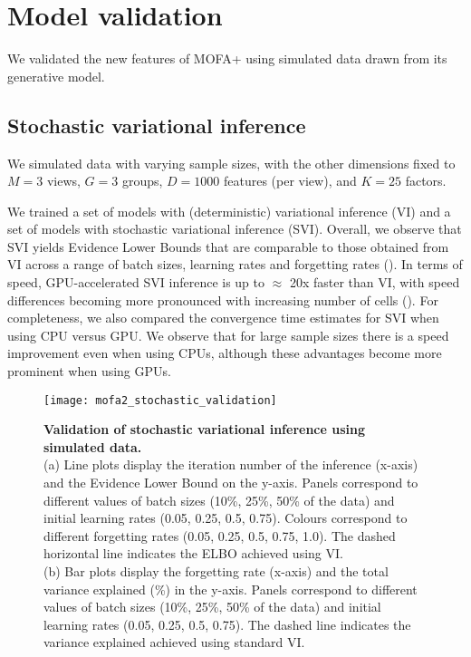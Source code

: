 \graphicspath{{Chapter4/Figs/simulations/}{Chapter4/Figs/scrna/}{Chapter4/Figs/scmet/}{Chapter4/Figs/scnmt/}}

\section{Model validation}

We validated the new features of MOFA+ using simulated data drawn from its generative model.

\subsection{Stochastic variational inference}

We simulated data with varying sample sizes, with the other dimensions fixed to $M=3$ views, $G=3$ groups, $D=1000$ features (per view), and $K=25$ factors.

We trained a set of models with (deterministic) variational inference (VI) and a set of models with stochastic variational inference (SVI). Overall, we observe that SVI yields Evidence Lower Bounds that are comparable to those obtained from VI across a range of batch sizes, learning rates and forgetting rates (). In terms of speed, GPU-accelerated SVI inference is up to $\approx$ 20x faster than VI, with speed differences becoming more pronounced with increasing number of cells (). For completeness, we also compared the convergence time estimates for SVI when using CPU versus GPU. We observe that for large sample sizes there is a speed improvement even when using CPUs, although these advantages become more prominent when using GPUs.

\begin{figure}[H]
	\centering
	\texttt{[image: mofa2\_stochastic\_validation]}
	\caption[]{
	\textbf{Validation of stochastic variational inference using simulated data.} \\
	(a) Line plots display the iteration number of the inference (x-axis) and the Evidence Lower Bound on the y-axis. Panels correspond to different values of batch sizes (10\%, 25\%, 50\% of the data) and initial learning rates (0.05, 0.25, 0.5, 0.75). Colours correspond to different forgetting rates (0.05, 0.25, 0.5, 0.75, 1.0). The dashed horizontal line indicates the ELBO achieved using VI. \\
	(b) Bar plots display the forgetting rate (x-axis) and the total variance explained (\%) in the y-axis. Panels correspond to different values of batch sizes (10\%, 25\%, 50\% of the data) and initial learning rates (0.05, 0.25, 0.5, 0.75). The dashed line indicates the variance explained achieved using standard VI. 
	}
	\label{fig:mofa2_stochastic_validation}
\end{figure}


